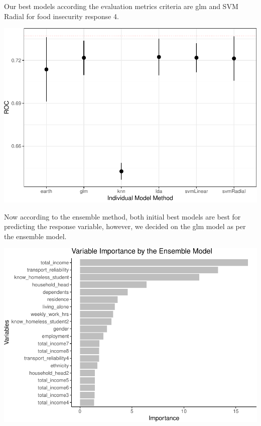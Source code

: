 \documentclass[
  10pt,
]{article}
\begin{document}
Our best models according the evaluation metrics criteria are glm and SVM Radial for food insecurity response 4.\\

\begin{center}\includegraphics{phase2_report_files/figure-latex/unnamed-chunk-30-1} \end{center}

Now according to the ensemble method, both initial best models are best for predicting the response variable, however, we decided on the glm model as per the ensemble model.\\

\begin{center}\includegraphics{phase2_report_files/figure-latex/unnamed-chunk-31-1} \end{center}
\end{document}
